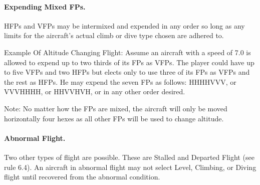 \paragraph{Expending Mixed FPs.}
HFPs and VFPs may be intermixed and expended in any order so long as any limits for the aircraft's actual climb or dive type chosen are adhered to.

Example Of Altitude Changing Flight: Assume an aircraft with a speed of 7.0 is allowed to expend up to two thirds of its FPs as VFPs. The player could have up to five VFPs and two HFPs but elects only to use three of its FPs as VFPs and the rest as HFPs. He may expend the seven FPs as follows:
HHHHVVV, or VVVHHHH, or HHVVHVH, or in any other order desired.

Note: No matter how the FPs are mixed, the aircraft will only be moved horizontally four hexes as all other FPs will be used to change altitude.


\paragraph{Abnormal Flight.} 
Two other types of flight are possible. These are Stalled and Departed Flight (see rule 6.4).  An aircraft in abnormal flight may not select Level, Climbing, or Diving flight until recovered from the abnormal condition.

